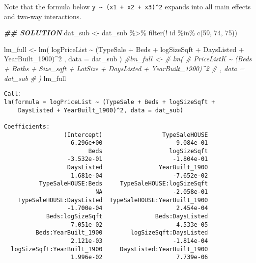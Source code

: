 \documentclass[
  12pt,
]{article}
\newenvironment{Shaded}{\begin{snugshade}}{\end{snugshade}}
\newcommand{\AttributeTok}[1]{\textcolor[rgb]{0.77,0.63,0.00}{#1}}
\newcommand{\CommentTok}[1]{\textcolor[rgb]{0.56,0.35,0.01}{\textit{#1}}}
\newcommand{\DecValTok}[1]{\textcolor[rgb]{0.00,0.00,0.81}{#1}}
\newcommand{\DocumentationTok}[1]{\textcolor[rgb]{0.56,0.35,0.01}{\textbf{\textit{#1}}}}
\newcommand{\FunctionTok}[1]{\textcolor[rgb]{0.00,0.00,0.00}{#1}}
\newcommand{\NormalTok}[1]{#1}
\newcommand{\OtherTok}[1]{\textcolor[rgb]{0.56,0.35,0.01}{#1}}
\newcommand{\SpecialCharTok}[1]{\textcolor[rgb]{0.00,0.00,0.00}{#1}}
\begin{document}
Note that the formula below
\texttt{y\ \textasciitilde{}\ (x1\ +\ x2\ +\ x3)\^{}2} expands into all
main effects and two-way interactions.

\begin{Shaded}
\begin{Highlighting}[]
  \DocumentationTok{\#\# SOLUTION}
\NormalTok{dat\_sub }\OtherTok{\textless{}{-}}\NormalTok{ dat\_sub }\SpecialCharTok{\%\textgreater{}\%}
  \FunctionTok{filter}\NormalTok{(}\SpecialCharTok{!}\NormalTok{ id }\SpecialCharTok{\%in\%} \FunctionTok{c}\NormalTok{(}\DecValTok{59}\NormalTok{, }\DecValTok{74}\NormalTok{, }\DecValTok{75}\NormalTok{))}

\NormalTok{  lm\_full }\OtherTok{\textless{}{-}}
    \FunctionTok{lm}\NormalTok{(}
\NormalTok{      logPriceList }\SpecialCharTok{\textasciitilde{}}\NormalTok{ (TypeSale }\SpecialCharTok{+}\NormalTok{ Beds }\SpecialCharTok{+}\NormalTok{ logSizeSqft }\SpecialCharTok{+}\NormalTok{ DaysListed }\SpecialCharTok{+}\NormalTok{ YearBuilt\_1900)}\SpecialCharTok{\^{}}\DecValTok{2}
\NormalTok{    , }\AttributeTok{data =}\NormalTok{ dat\_sub}
\NormalTok{    )}
  \CommentTok{\#lm\_full \textless{}{-}}
  \CommentTok{\#  lm(}
  \CommentTok{\#    PriceListK \textasciitilde{} (Beds + Baths + Size\_sqft + LotSize + DaysListed + YearBuilt\_1900)\^{}2}
  \CommentTok{\#  , data = dat\_sub}
  \CommentTok{\#  )}
\NormalTok{  lm\_full}
\end{Highlighting}
\end{Shaded}

\begin{verbatim}
Call:
lm(formula = logPriceList ~ (TypeSale + Beds + logSizeSqft + 
    DaysListed + YearBuilt_1900)^2, data = dat_sub)

Coefficients:
                 (Intercept)                 TypeSaleHOUSE  
                   6.296e+00                     9.084e-01  
                        Beds                   logSizeSqft  
                  -3.532e-01                    -1.804e-01  
                  DaysListed                YearBuilt_1900  
                   1.681e-04                    -7.652e-02  
          TypeSaleHOUSE:Beds     TypeSaleHOUSE:logSizeSqft  
                          NA                    -2.058e-01  
    TypeSaleHOUSE:DaysListed  TypeSaleHOUSE:YearBuilt_1900  
                  -1.700e-04                     2.454e-04  
            Beds:logSizeSqft               Beds:DaysListed  
                   7.051e-02                     4.533e-05  
         Beds:YearBuilt_1900        logSizeSqft:DaysListed  
                   2.121e-03                    -1.814e-04  
  logSizeSqft:YearBuilt_1900     DaysListed:YearBuilt_1900  
                   1.996e-02                     7.739e-06  
\end{verbatim}
\end{document}
